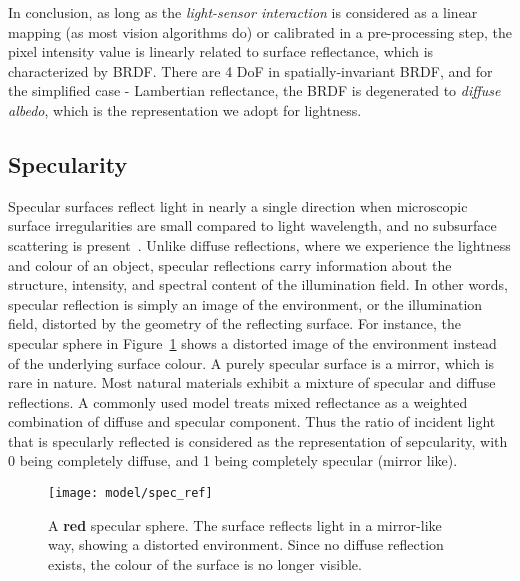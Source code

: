 In conclusion, as long as the \textit{light-sensor interaction} is considered as a linear mapping (as most vision algorithms do) or calibrated in a pre-processing step, the pixel intensity value is linearly related to surface reflectance, which is characterized by BRDF. There are 4 DoF in spatially-invariant BRDF, and for the simplified case - Lambertian reflectance, the BRDF is degenerated to \textit{diffuse albedo}, which is the representation we adopt for lightness.


\subsection{Specularity}
Specular surfaces reflect light in nearly a single direction when microscopic surface irregularities are small compared to light wavelength, and no subsurface scattering is present~\cite{nayar1989surface}. Unlike diffuse reflections, where we experience the lightness and colour of an object, specular reflections carry information about the structure, intensity, and spectral content of the illumination field. In other words, specular reflection is simply an image of the environment, or the illumination field, distorted by the geometry of the reflecting surface. For instance, the specular sphere in Figure~\ref{fig:spec_ref} shows a distorted image of the environment instead of the underlying surface colour. A purely specular surface is a mirror, which is rare in nature. Most natural materials exhibit a mixture of specular and diffuse reflections. A commonly used model treats mixed reflectance as a weighted combination of diffuse and specular component. Thus the ratio of incident light that is specularly reflected is considered as the representation of sepcularity, with 0 being completely diffuse, and 1 being completely specular (mirror like).
\begin{figure}[!htbp]
\centering
\texttt{[image: model/spec\_ref]}
\caption{A \textbf{red} specular sphere. The surface reflects light in a mirror-like way, showing a distorted environment. Since no diffuse reflection exists, the colour of the surface is no longer visible.}
\label{fig:spec_ref}
\end{figure}

